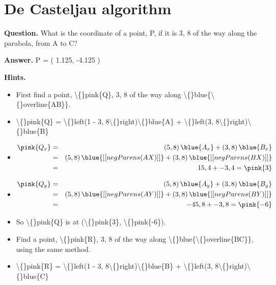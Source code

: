 \documentclass{article}
\begin{document}
\section*{De Casteljau algorithm}
\textbf{Question.} What is the coordinate of a point, P, if it is 3, 8 of the way along the parabola,
                    from A to C?

\textbf{Answer.} P = (
                        1.125,
                        -4.125
                        )

\textbf{Hints.}
\begin{itemize}
  \item First find a point, \textbackslash\{\}pink\{Q\}, 3, 8 of the way along \textbackslash\{\}blue\{\textbackslash\{\}overline\{AB\}\}.
  \item \textbackslash\{\}pink\{Q\} = \textbackslash\{\}left(1 - 3, 8\textbackslash\{\}right)\textbackslash\{\}blue\{A\} + \textbackslash\{\}left(3, 8\textbackslash\{\}right)\textbackslash\{\}blue\{B\}
  \item $\begin{aligned} \pink{Q_x}
                        &=& \left(5, 8\right)\blue{A_x} +
                        \left(3, 8\right)\blue{B_x} \\
                        &=& \left(5, 8\right)\blue{[[negParens(AX)]]} + 
                        \left(3, 8\right)\blue{[[negParens(BX)]]} \\
                        &=& 15, 4 + -3, 4
                        = \pink{3}
                        \end{aligned}$
  \item $\begin{aligned} \pink{Q_y}
                        &=& \left(5, 8\right)\blue{A_y} +
                        \left(3, 8\right)\blue{B_y} \\
                        &=& \left(5, 8\right)\blue{[[negParens(AY)]]} + 
                        \left(3, 8\right)\blue{[[negParens(BY)]]} \\
                        &=& -45, 8 + -3, 8
                        = \pink{-6}
                        \end{aligned}$
  \item So \textbackslash\{\}pink\{Q\} is at (\textbackslash\{\}pink\{3\}, \textbackslash\{\}pink\{-6\}).
  \item Find a point, \textbackslash\{\}pink\{R\}, 3, 8 of the way along \textbackslash\{\}blue\{\textbackslash\{\}overline\{BC\}\},
                        using the same method.
  \item \textbackslash\{\}pink\{R\} = \textbackslash\{\}left(1 - 3, 8\textbackslash\{\}right)\textbackslash\{\}blue\{B\} + \textbackslash\{\}left(3, 8\textbackslash\{\}right)\textbackslash\{\}blue\{C\}

\end{itemize}
\end{document}
